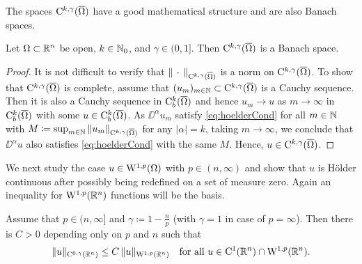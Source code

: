The spaces $\mathrm{C}^{k,\gamma}(\overline\Omega)$ have a good mathematical structure and are also Banach spaces.

\begin{prop}
  Let $\Omega \subset \mathbb{R}^n$ be open, $k \in \mathbb{N}_0$, and $\gamma \in (0,1]$.
  Then $\mathrm{C}^{k,\gamma}(\overline\Omega)$ is a Banach space.
\end{prop}

\begin{proof}
  It is not difficult to verify that $\| \,\cdot\, \|_{\mathrm{C}^{k,\gamma}(\overline\Omega)}$ is a norm on $\mathrm{C}^{k,\gamma}(\overline\Omega)$.
  To show that $\mathrm{C}^{k,\gamma}(\overline\Omega)$ is complete, assume that $(u_m)_{m \in \mathbb{N}} \subset \mathrm{C}^{k,\gamma}(\overline\Omega)$ is a Cauchy sequence.
  Then it is also a Cauchy sequence in $\mathrm{C}_b^k(\overline\Omega)$ and hence $u_m \to u$ as $m \to \infty$ in $\mathrm{C}_b^k(\overline\Omega)$ with some $u \in \mathrm{C}_b^k(\overline\Omega)$.
  As $\DD^\alpha u_m$ satisfy \eqref{eq:hoelderCond} for all $m \in \mathbb{N}$ with $M \coloneqq \sup_{m \in \mathbb{N}} \| u_m\|_{\mathrm{C}^{k,\gamma}(\overline\Omega)}$ for any $|\alpha| = k$, taking $m \to \infty$, we conclude that $\DD^\alpha u$ also satisfies \eqref{eq:hoelderCond} with the same $M$.
  Hence, $u \in \mathrm{C}^{k,\gamma}(\overline\Omega)$.
\end{proof}

We next study the case $u \in \mathrm{W}^{1,p}(\Omega)$ with $p \in (n,\infty)$ and show that $u$ is Hölder continuous after possibly being redefined on a set of measure zero.
Again an inequality for $\mathrm{W}^{1,p}(\mathbb{R}^n)$ functions will be the basis.

\begin{thm}
Assume that $p \in (n,\infty]$ and $\gamma \coloneqq 1 - \frac{n}{p}$ (with $\gamma = 1$ in case of $p = \infty$).
Then there is $C > 0$ depending only on $p$ and $n$ such that
\begin{equation}
  \label{eq:morrey}
  \|u\|_{\mathrm{C}^{0,\gamma}(\mathbb{R}^n)} \leq C \, \|u\|_{\mathrm{W}^{1,p}(\mathbb{R}^n)} \quad\text{for all } u \in \mathrm{C}^1(\mathbb{R}^n) \cap \mathrm{W}^{1,p}(\mathbb{R}^n).
\end{equation}
\end{thm}

